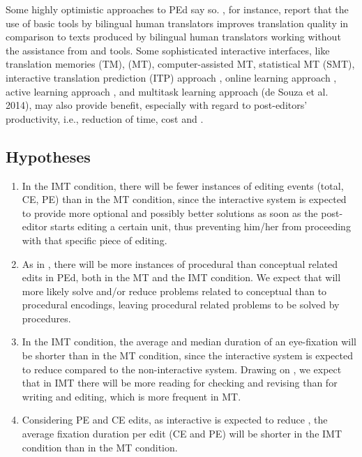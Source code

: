 \documentclass[output=paper]{langsci/langscibook}
\begin{document}
Some highly optimistic approaches to PEd say so. \citet{Green2013}, for instance, report that the use of basic  tools by bilingual human translators improves translation quality in comparison to texts produced by bilingual human translators working without the assistance from  and  tools. Some sophisticated interactive interfaces, like translation memories (TM),  (MT), computer-assisted MT, statistical MT (SMT), interactive translation prediction (ITP) approach \citep{langlais2002, casacuberta2009, Barrachina2009}, online learning approach \citep{OrtizMartinez2010}, active learning approach \citep{gonzalez2014cost}, and multitask learning approach (de Souza et al. 2014), may also provide benefit, especially with regard to post-editors' productivity, i.e., reduction of time, cost and .


\subsection{Hypotheses\label{alves:sec:Hypotheses}}

\begin{enumerate}
\item In the IMT condition, there will be fewer instances of editing events (total, CE, PE) than in the MT condition, since the interactive system is expected to provide more optional and possibly better solutions as soon as the post-editor starts editing a certain unit, thus preventing him/her from proceeding with that specific piece of editing.
\item As in \citet{alves2013}, there will be more instances of procedural than conceptual related edits in PEd, both in the MT and the IMT condition. We expect that  will more likely solve and/or reduce problems related to conceptual than to procedural encodings, leaving procedural related problems to be solved by  procedures.
\item In the IMT condition, the average and median duration of an eye-fixation will be shorter than in the MT condition, since the interactive system is expected to reduce  compared to the non-interactive system. Drawing on \citet{jakobsen2008}, we expect that in IMT there will be more reading for checking and revising than for writing and editing, which is more frequent in MT.
\item Considering PE and CE edits, as interactive  is expected to reduce , the average fixation duration per edit (CE and PE) will be shorter in the IMT condition than in the MT condition.
\end{enumerate}
\end{document}

